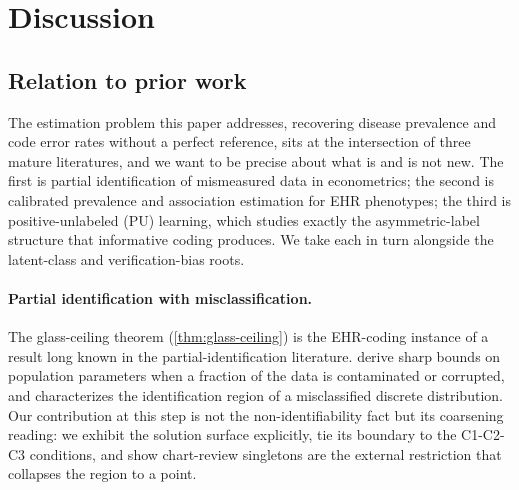 \section{Discussion}
\label{sec:discussion}

\subsection{Relation to prior work}

The estimation problem this paper addresses, recovering disease
prevalence and code error rates without a perfect reference, sits at
the intersection of three mature literatures, and we want to be
precise about what is and is not new. The first is partial
identification of mismeasured data in econometrics; the second is
calibrated prevalence and association estimation for EHR phenotypes;
the third is positive-unlabeled (PU) learning, which studies exactly
the asymmetric-label structure that informative coding produces. We
take each in turn alongside the latent-class and verification-bias
roots.

\paragraph{Partial identification with misclassification.} The
glass-ceiling theorem (\cref{thm:glass-ceiling}) is the EHR-coding
instance of a result long known in the partial-identification
literature. \citet{horowitz1995identification} derive sharp bounds on
population parameters when a fraction of the data is contaminated or
corrupted, and \citet{molinari2008partial} characterizes the
identification region of a misclassified discrete distribution. Our
contribution at this step is not the non-identifiability fact but its
coarsening reading: we exhibit the solution surface explicitly, tie
its boundary to the C1-C2-C3 conditions, and show chart-review
singletons are the external restriction that collapses the region to a
point.

